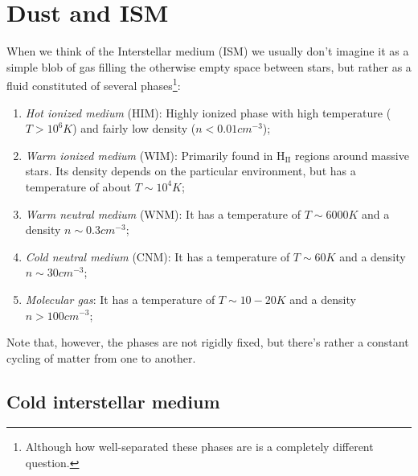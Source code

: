 \chapter{Dust and ISM}\label{ch:iv}

When we think of the Interstellar medium (ISM) we usually don't imagine it as a simple blob of gas filling the otherwise empty space between stars, but rather as a fluid constituted of several phases\footnote{Although how well-separated these phases are is a completely different question.}:
\begin{enumerate}
    \item \emph{Hot ionized medium} (HIM): Highly ionized phase with high temperature ($T>10^{6}\unit{K}$) and fairly low density ($n<0.01\unit{cm}^{-3}$);
    \item \emph{Warm ionized medium} (WIM): Primarily found in H$_{\text{II}}$ regions around massive stars. Its density depends on the particular environment, but has a temperature of about $T\sim 10^{4}\unit{K}$;
    \item \emph{Warm neutral medium} (WNM): It has a temperature of $T\sim 6000\unit{K}$ and a density $n\sim 0.3\unit{cm}^{-3}$;
    \item \emph{Cold neutral medium} (CNM): It has a temperature of $T\sim 60\unit{K}$ and a density $n\sim 30\unit{cm}^{-3}$;
    \item \emph{Molecular gas}: It has a temperature of $T\sim 10-20\unit{K}$ and a density $n > 100\unit{cm}^{-3}$;
\end{enumerate}
Note that, however, the phases are not rigidly fixed, but there's rather a constant cycling of matter from one to another.

\section{Cold interstellar medium}

